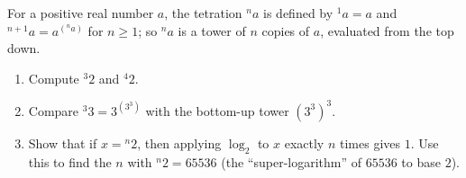 For a positive real number $a$, the tetration ${}^{n}a$ is defined by ${}^{1}a=a$ and ${}^{n+1}a=a^{\left({}^{n}a\right)}$ for $n\ge1$; so ${}^{n}a$ is a tower of $n$ copies of $a$, evaluated from the top down.
\begin{enumerate}
\item[(a)] Compute ${}^{3}2$ and ${}^{4}2$.
\item[(b)] Compare ${}^{3}3=3^{\left(3^3\right)}$ with the bottom-up tower $\left(3^3\right)^3$.
\item[(c)] Show that if $x={}^{n}2$, then applying $\log_2$ to $x$ exactly $n$ times gives $1$. Use this to find the $n$ with ${}^{n}2=65536$ (the ``super-logarithm'' of $65536$ to base $2$).
\end{enumerate}
